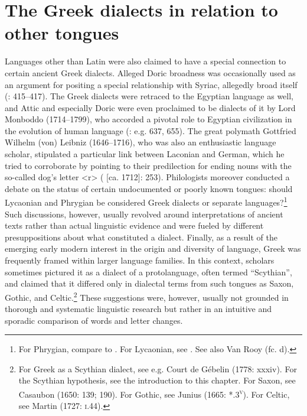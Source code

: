 \section{The Greek dialects in relation to other tongues}

Languages other than Latin were also claimed to have a special connection to certain ancient Greek dialects. Alleged Doric broadness was occasionally used as an argument for positing a special relationship with Syriac, allegedly broad itself (\citealt{Saumaise1643a}: 415–417). The Greek dialects were retraced to the Egyptian language as well, and Attic and especially Doric were even proclaimed to be dialects of it by Lord Monboddo (1714–1799), who accorded a pivotal role to Egyptian civilization in the evolution of human language (\citealt{Monboddo1774}: e.g. 637, 655). The great polymath Gottfried Wilhelm (von) Leibniz (1646–1716), who was also an enthusiastic language scholar, stipulated a particular link between Laconian and German, which he tried to corroborate by pointing to their predilection for ending nouns with the so-called dog’s letter <r> (\citealt{Leibniz1991} [ca. 1712]: 253). Philologists moreover conducted a debate on the status of certain undocumented or poorly known tongues: should Lycaonian and Phrygian be considered Greek dialects or separate languages?\footnote{For Phrygian, compare \citet[465]{Rijcke1684} to \citet[16]{Jablonski1714}. For Lycaonian, see \citet[2]{Jablonski1714}. See also Van Rooy (fc. d).} Such discussions, however, usually revolved around interpretations of ancient texts rather than actual linguistic evidence and were fueled by different presuppositions about what constituted a dialect. Finally, as a result of the emerging early modern interest in the origin and diversity of language, Greek was frequently framed within larger language families. In this context, scholars sometimes pictured it as a dialect of a protolanguage, often termed “Scythian”, and claimed that it differed only in dialectal terms from such tongues as Saxon, Gothic, and Celtic.\footnote{For Greek as a Scythian dialect, see e.g. Court de Gébelin (1778: xxxiv). For the Scythian hypothesis, see the introduction to this chapter. For Saxon, see Casaubon (1650: 139; 190). For Gothic, see Junius (1665: *.3\textsc{\textsuperscript{v}}). For Celtic, see Martin (1727: \textsc{i}.44).} These suggestions were, however, usually not grounded in thorough and systematic linguistic research but rather in an intuitive and sporadic comparison of words and letter changes.

